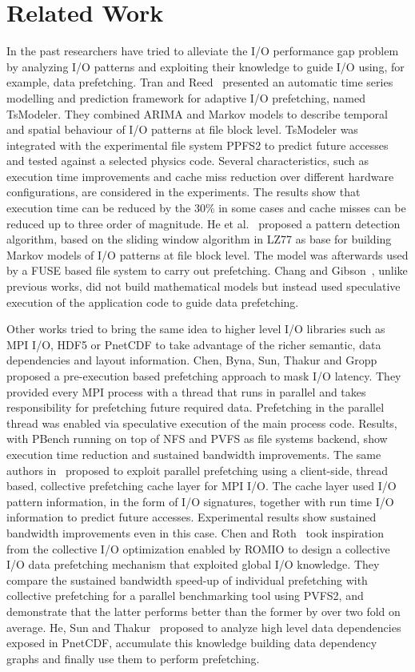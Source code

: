 \section{Related Work}
\label{sec: mercury_related_work}
In the past researchers have tried to alleviate the I/O performance gap problem by analyzing I/O patterns and exploiting their knowledge to guide I/O using, for example, data prefetching. Tran and Reed~\cite{TranR04} presented an automatic time series 
modelling and prediction framework for adaptive I/O prefetching, named TsModeler. They combined ARIMA and Markov models to describe temporal and spatial behaviour of I/O patterns at file block level. TsModeler was integrated with the experimental file 
system PPFS2 to predict future accesses and tested against a selected physics code. Several characteristics, such as execution time improvements and cache miss reduction over different hardware configurations, are considered in the experiments. The results 
show that execution time can be reduced by the 30\% in some cases and cache misses can be reduced up to three order of magnitude. 
He et al.~\cite{HEBTAGGMCS13} proposed a pattern detection algorithm, based on the sliding window algorithm in LZ77 as base for building Markov models of I/O patterns at file block level. The model was afterwards used by a FUSE based file system to carry 
out prefetching. Chang and Gibson~\cite{ChangG99}, unlike previous works, did not build mathematical models but instead used speculative execution of the application code to guide data prefetching.

Other works tried to bring the same idea to higher level I/O libraries such as MPI I/O, HDF5 or PnetCDF to take advantage of the richer semantic, data dependencies and layout information. Chen, Byna, Sun, Thakur and Gropp~\cite{ChenBSTG08} proposed a 
pre-execution based prefetching approach to mask I/O latency. They provided every MPI process with a thread that runs in parallel and takes responsibility for prefetching future required data. Prefetching in the parallel thread was enabled via speculative 
execution of the main process code. Results, with PBench running on top of NFS and PVFS as file systems backend, show execution time reduction and sustained bandwidth improvements.
The same authors in~\cite{BynaCST08} proposed to exploit parallel prefetching using a client-side, thread based, collective prefetching cache layer for MPI I/O. The cache layer used I/O pattern information, in the form of I/O signatures, together with run 
time I/O information to predict future accesses. Experimental results show sustained bandwidth improvements even in this case. 
Chen and Roth~\cite{ChenR10} took inspiration from the collective I/O optimization enabled by ROMIO to design a collective I/O data prefetching mechanism that exploited global I/O knowledge. They compare the sustained bandwidth speed-up of individual 
prefetching with collective prefetching for a parallel benchmarking tool using PVFS2, and demonstrate that the latter performs better than the former by over two fold on average. 
He, Sun and Thakur~\cite{HEST12} proposed to analyze high level data dependencies exposed in PnetCDF, accumulate this knowledge building data dependency graphs and finally use them to perform prefetching. 

